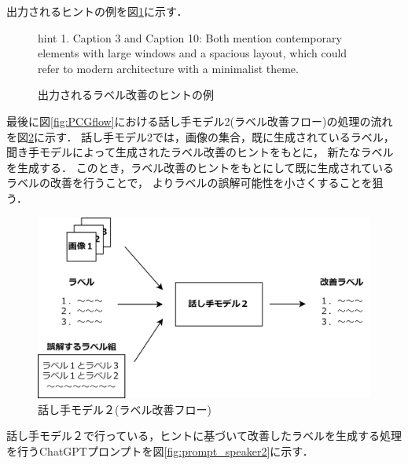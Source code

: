 \documentclass[a4paper,11pt]{jreport}
\begin{document}
出力されるヒントの例を図\ref{fig:hint_example}に示す．

\begin{figure}[H]
  \begin{mdframed}[linewidth=1pt]
    hint 1. Caption 3 and Caption 10: Both mention contemporary elements with large windows and a spacious layout, which could refer to modern architecture with a minimalist theme.
  \end{mdframed}
  \caption{出力されるラベル改善のヒントの例}
  \label{fig:hint_example}
\end{figure}

最後に図\ref{fig:PCGflow}における話し手モデル2(ラベル改善フロー)の処理の流れを図\ref{fig:PCGspeaker2}に示す．
話し手モデル2では，画像の集合，既に生成されているラベル，聞き手モデルによって生成されたラベル改善のヒントをもとに，
新たなラベルを生成する．
このとき，ラベル改善のヒントをもとにして既に生成されているラベルの改善を行うことで，
よりラベルの誤解可能性を小さくすることを狙う．

\begin{figure}[H]
	\centering
	\includegraphics[width=0.8\linewidth]{figures/PCGspeaker2.png}
	\caption{話し手モデル２(ラベル改善フロー)}
	\label{fig:PCGspeaker2}
\end{figure}

話し手モデル２で行っている，ヒントに基づいて改善したラベルを生成する処理を行うChatGPTプロンプトを図\ref{fig:prompt_speaker2}に示す．
\end{document}
